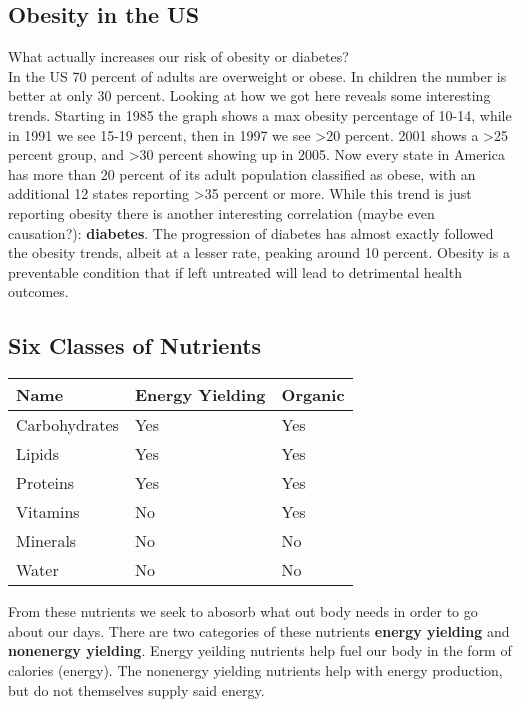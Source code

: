 \documentclass[letterpaper, 11pt]{article}
\begin{document}
\subsection{Obesity in the US}
\label{sec:org3131252}
What actually increases our risk of obesity or diabetes?\\

In the US 70 percent of adults are overweight or obese. In children the number is better at only 30 percent. Looking at how we got here reveals some interesting trends. Starting in 1985 the graph shows a max obesity percentage of 10-14, while in 1991 we see 15-19 percent, then in 1997 we see >20 percent. 2001 shows a >25 percent group, and >30 percent showing up in 2005. Now every state in America has more than 20 percent of its adult population classified as obese, with an additional 12 states reporting >35 percent or more. While this trend is just reporting obesity there is another interesting correlation (maybe even causation?): \textbf{diabetes}. The progression of diabetes has almost exactly followed the obesity trends, albeit at a lesser rate, peaking around 10 percent. Obesity is a preventable condition that if left untreated will lead to detrimental health outcomes.\\
\subsection{Six Classes of Nutrients}
\label{sec:orgca8a5a7}
\begin{center}
\begin{tabular}{lll}
Name & Energy Yielding & Organic\\
\hline
Carbohydrates & Yes & Yes\\
Lipids & Yes & Yes\\
Proteins & Yes & Yes\\
Vitamins & No & Yes\\
Minerals & No & No\\
Water & No & No\\
\end{tabular}
\end{center}
From these nutrients we seek to abosorb what out body needs in order to go about our days. There are two categories of these nutrients \textbf{energy yielding} and \textbf{nonenergy yielding}. Energy yeilding nutrients help fuel our body in the form of calories (energy). The nonenergy yielding nutrients help with energy production, but do not themselves supply said energy.\\
\end{document}
